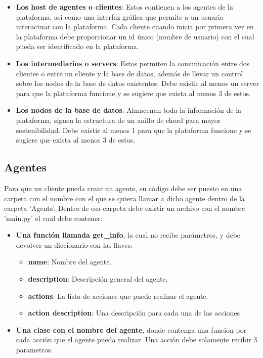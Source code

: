 \documentclass[11pt]{article}
\begin{document}
    \begin{itemize}
        \item \textbf{Los host de agentes o clientes}: Estos contienen a los agentes de la plataforma, asi como una 
        interfaz gráfica que permite a un usuario interactuar con la plataforma. Cada cliente cuando 
        inicia por primera vez en la plataforma debe proporcionar un id único (nombre de usuario) con el 
        cual pueda ser identificado en la plataforma.

        \item \textbf{Los intermediarios o servers}: Estos permiten la comunicación entre dos clientes o entre un cliente y 
        la base de datos, además de llevar un control sobre los nodos de la base de datos existentes. Debe existir al 
        menos un server para que la plataforma funcione y se sugiere que exista al menos 3 de estos.

        \item \textbf{Los nodos de la base de datos}: Almacenan toda la información de la plataforma, siguen la estructura de un 
        anillo de chord para mayor sostenibilidad. Debe existir al menos 1 para que la plataforma funcione y se sugiere 
        que exista al menos 3 de estos.
    \end{itemize}

    \newpage

    \subsection{Agentes}

    Para que un cliente pueda crear un agente, su código debe ser puesto en una carpeta con el nombre con el que se quiera llamar 
    a dicho agente dentro de la carpeta 'Agents'. Dentro de esa carpeta debe existir un archivo con el nombre  'main.py' el cual 
    debe contener:

    \begin{itemize}
        \item \textbf{Una función llamada get\_info}, la cual no recibe parámetros, y debe devolver un diccionario con las llaves:
            \begin{itemize}
                \item \textbf{name}: Nombre del agente.
                \item \textbf{description}: Descripción general del agente.
                \item \textbf{actions}: La lista de acciones que puede realizar el agente.
                \item \textbf{action description}: Una descripción para cada una de las acciones
            \end{itemize}
        \item \textbf{Una clase con el nombre del agente}, donde contenga una funcion por cada acción que el agente pueda realizar. Una acción 
        debe solamente recibir 3 parametros.
    \end{itemize}
\end{document}
